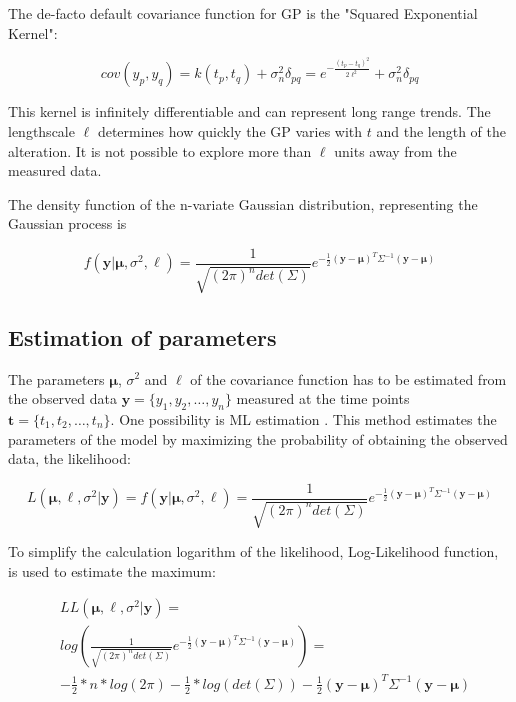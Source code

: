 	The de-facto default covariance function for \ac{GP} is the "Squared Exponential Kernel":
	
	\begin{displaymath}
		cov(y_{p},y_{q}) = k(t_{p},t_{q}) + \sigma^{2}_{n} \delta_{pq} = 
		e^{-\frac{(t_{p}-t_{q})^{2}}{2 \ell^{2}}} +
		\sigma^{2}_{n} \delta_{pq}
	\end{displaymath}
	
	This kernel is infinitely differentiable and can represent long range trends. The lengthscale $\ell$ determines how quickly the \ac{GP} varies with $t$ and the length of the alteration. It is not possible to explore more than $\ell$ units away from the measured data. 
	
	The density function of the n-variate Gaussian distribution, representing the Gaussian process is 
	
	\begin{displaymath}
	f(\pmb{y}|\pmb{\mu},\sigma^{2},\ell) = 
	\frac{1}{\sqrt{(2\pi)^{n}det(\Sigma)}}
	e^{- \frac{1}{2} (\pmb{y}-\pmb{\mu})^{T} \Sigma^{-1} (\pmb{y}-\pmb{\mu}) }
	\end{displaymath}
	
	
    \subsection{Estimation of parameters}
    The parameters $\pmb{\mu}$, $\sigma^{2}$ and $\ell$ of the covariance function has to be estimated from the observed data $\pmb{y}=\{y_{1},y_{2}, \ldots ,y_{n}\}$ measured at the time points $\pmb{t}=\{t_{1},t_{2}, \ldots ,t_{n}\}$.
    One possibility is \ac{ML} estimation \cite{wiki_maximum_likelihood}. This method estimates the parameters of the model by maximizing the probability of obtaining the observed data, the likelihood:
    
    \begin{displaymath}
    	L(\pmb{\mu},\ell,\sigma^{2}|\pmb{y}) = 
    	f(\pmb{y}|\pmb{\mu},\sigma^{2},\ell) = 
    	\frac{1}{\sqrt{(2\pi)^{n}det(\Sigma)}}
    	e^{- \frac{1}{2} (\pmb{y}-\pmb{\mu})^{T} \Sigma^{-1} (\pmb{y}-\pmb{\mu}) }
    \end{displaymath}       
    	
    To simplify the calculation logarithm of the likelihood, Log-Likelihood function, is used to estimate the maximum:
    
    \begin{align*}
    & LL(\pmb{\mu},\ell,\sigma^{2}|\pmb{y}) = \\
    & log(
    \frac{1}{\sqrt{(2\pi)^{n}det(\Sigma)}}
    e^{-\frac{1}{2}(\pmb{y}-\pmb{\mu})^{T} \Sigma^{-1} (\pmb{y}-\pmb{\mu})}) = \\
    & -\frac{1}{2} * n * log(2\pi) - \frac{1}{2} * log(det(\Sigma)) - \frac{1}{2} 
    (\pmb{y}-\pmb{\mu})^{T} \Sigma^{-1} (\pmb{y}-\pmb{\mu})
   \end{align*}
     
